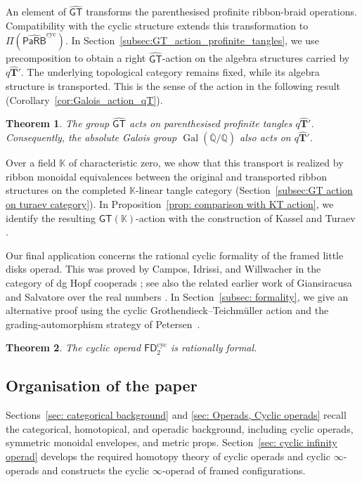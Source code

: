 \documentclass{amsart}
\newcommand{\bT}{\mathbf{T}}
\newcommand{\kk}{\mathbb{K}}    %
\newcommand{\PaRB}{\mathsf{PaRB}}
\newcommand{\gt}{\mathsf{GT}}
\newcommand{\GT}{\widehat{\mathsf{GT}}}
\newtheorem*{thm*}{Theorem}
\theoremstyle{definition}
\numberwithin{equation}{section}
\begin{document}
An element of $\GT$ transforms the parenthesised profinite
ribbon-braid operations. Compatibility with the cyclic
structure extends this transformation to
$\Pi(\widehat{\PaRB}^{\mathrm{cyc}})$.
In Section~\ref{subsec:GT_action_profinite_tangles}, we
use precomposition to obtain a right $\GT$-action on the
algebra structures carried by $q\widehat{\bT}'$.
The underlying topological category remains fixed, while
its algebra structure is transported. This is the sense
of the action in the following result
(Corollary~\ref{cor:Galois_action_qT}).

\begin{thm*}
The group $\GT$ acts on parenthesised profinite tangles
$q\widehat{\bT}'$. Consequently, the absolute Galois group
$\operatorname{Gal}(\overline{\mathbb Q}/\mathbb Q)$
also acts on $q\widehat{\bT}'$.
\end{thm*}

Over a field $\kk$ of characteristic zero, we show that this
transport is realized by ribbon monoidal equivalences between
the original and transported ribbon structures on the completed
$\kk$-linear tangle category
(Section~\ref{subsec:GT action on turaev category}).
In Proposition~\ref{prop: comparison with KT action}, we
identify the resulting $\gt(\kk)$-action with the construction
of Kassel and Turaev \cite[Appendix~D]{KT_Tangles}.

Our final application concerns the rational cyclic formality of the
framed little disks operad. This was proved by Campos, Idrissi, and
Willwacher in the category of dg Hopf cooperads
\cite[Theorem~3.1]{campos2019configuration}; see also the related
earlier work of Giansiracusa and Salvatore over the real numbers
\cite{Salvatore_2012_cyclic_formality}. In
Section~\ref{subsec: formality}, we give an alternative proof using
the cyclic Grothendieck--Teichmüller action and the
grading-automorphism strategy of
Petersen~\cite{petersen_formality}.

\begin{thm*}
The cyclic operad $\mathsf{FD}_2^{\mathrm{cyc}}$ is rationally
formal.
\end{thm*}

\subsection*{Organisation of the paper}

Sections~\ref{sec: categorical background} and
\ref{sec: Operads, Cyclic operads} recall the categorical,
homotopical, and operadic background, including cyclic operads,
symmetric monoidal envelopes, and metric props.
Section~\ref{sec: cyclic infinity operad} develops the required
homotopy theory of cyclic operads and cyclic $\infty$-operads and
constructs the cyclic $\infty$-operad of framed configurations.
\end{document}
